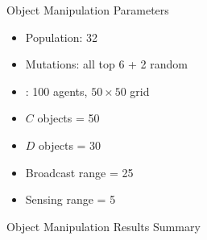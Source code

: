 
\begin{slide}{Object Manipulation}
  Parameters
  \begin{itemize}
  \item Population: 32
  \item Mutations: all top 6 + 2 random
  \item \SWEEP: 100 agents, $50\times50$ grid
  \item $C$ objects = 50
  \item $D$ objects = 30
  \item Broadcast range = 25
  \item Sensing range = 5
  \end{itemize}
\end{slide}


\begin{slide}{Object Manipulation}
  Results Summary
\end{slide}


%


%

